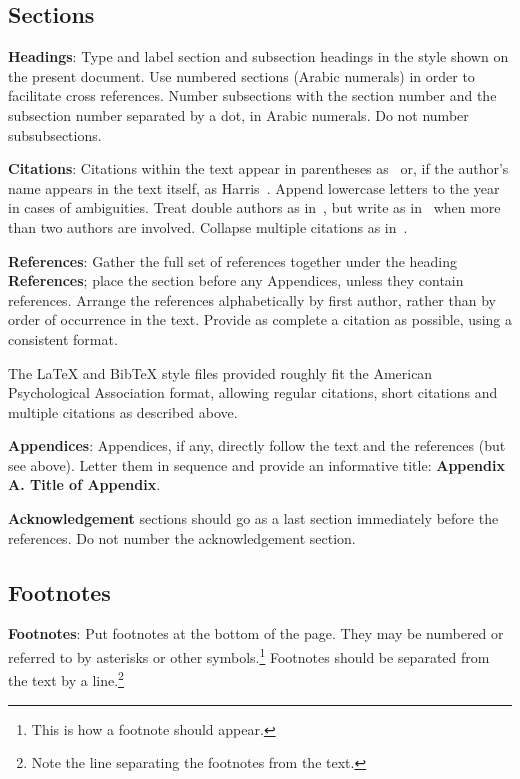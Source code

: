 \documentclass[11pt]{article}
\begin{document}
\subsection{Sections}

{\bf Headings}: Type and label section and subsection headings in the
style shown on the present document.  Use numbered sections (Arabic
numerals) in order to facilitate cross references. Number subsections
with the section number and the subsection number separated by a dot,
in Arabic numerals. Do not number subsubsections.

{\bf Citations}: Citations within the text appear in parentheses
as~\cite{harris1955-phoneme} or, if the author's name appears in the
text itself, as Harris~.  Append
lowercase letters to the year in cases of ambiguities.  Treat double
authors as in~\cite{hafer1974-word}, but write as
in~\cite{hana2006-tagging} when more than two authors are involved.
Collapse multiple citations as
in~\cite{harris1967-morpheme,dejean1998-morphemes}.

\textbf{References}: Gather the full set of references together under
the heading {\bf References}; place the section before any Appendices,
unless they contain references. Arrange the references alphabetically
by first author, rather than by order of occurrence in the text.
Provide as complete a citation as possible, using a consistent format.

The \LaTeX{} and Bib\TeX{} style files provided roughly fit the
American Psychological Association format, allowing regular citations, 
short citations and multiple citations as described above.

{\bf Appendices}: Appendices, if any, directly follow the text and the
references (but see above).  Letter them in sequence and provide an
informative title: {\bf Appendix A. Title of Appendix}.

\textbf{Acknowledgement} sections should go as a last section immediately
before the references.  Do not number the acknowledgement section.

\subsection{Footnotes}

{\bf Footnotes}: Put footnotes at the bottom of the page. They may
be numbered or referred to by asterisks or other
symbols.\footnote{This is how a footnote should appear.} Footnotes
should be separated from the text by a line.\footnote{Note the
line separating the footnotes from the text.}
\end{document}
